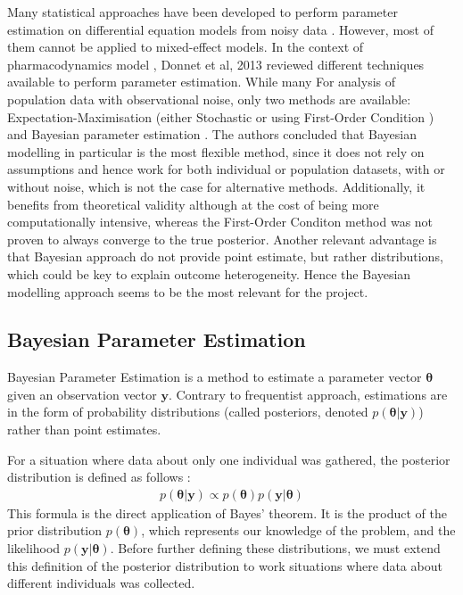 \documentclass[11pt]{article}
\begin{document}
Many statistical approaches have been developed to perform parameter estimation on differential equation models from noisy data \cite{liu_wang}. However, most of them cannot be applied to mixed-effect models. In the context of pharmacodynamics model , Donnet et al, 2013 \cite{revParamEst} reviewed different techniques available to perform parameter estimation. While many For analysis of population data with observational noise, only two methods are available: Expectation-Maximisation (either Stochastic \cite{SAEM} or using First-Order Condition \cite{foce}) and Bayesian parameter estimation \cite{rosenbaum}. The authors concluded that Bayesian modelling in particular is the most flexible method, since it does not rely on assumptions and hence work for both individual or population datasets, with or without noise, which is not the case for alternative methods. Additionally, it benefits from theoretical validity although at the cost of being more computationally intensive, whereas the First-Order Conditon method was not proven to always converge to the true posterior. Another relevant advantage is that Bayesian approach do not provide point estimate, but rather distributions, which could be key to explain outcome heterogeneity. Hence the Bayesian modelling approach seems to be the most relevant for the project. 

\subsection{Bayesian Parameter Estimation}

Bayesian Parameter Estimation is a method to estimate a parameter vector $\boldsymbol{\theta}$ given an observation vector $\boldsymbol{y}$. Contrary to frequentist approach, estimations are in the form of probability distributions (called posteriors, denoted $p(\boldsymbol{\theta}|\boldsymbol{y})$) rather than point estimates. 

For a situation where data about only one individual was gathered, the posterior distribution is defined as follows \cite{tbk_gelman}:
\begin{align*}
    p(\boldsymbol{\theta} | \boldsymbol{y}) \propto p(\boldsymbol{\theta})p(\boldsymbol{y}|\boldsymbol{\theta})
\end{align*} 
This formula is the direct application of Bayes' theorem. It is the product of the prior distribution $p(\boldsymbol{\theta})$, which represents our knowledge of the problem, and the likelihood $p(\boldsymbol{y} | \boldsymbol{\theta})$. Before further defining these distributions, we must extend this definition of the posterior distribution to work situations where data about different individuals was collected. 
\end{document}

